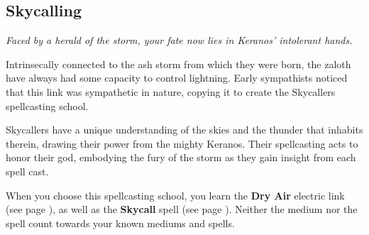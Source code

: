 \subsection*{Skycalling} \label{ssec::skycalling}
    \textit{Faced by a herald of the storm, your fate now lies in Keranos' intolerant hands.}

    Intrinsecally connected to the ash storm from which they were born, the zaloth have always had some capacity to control lightning.
    Early sympathists noticed that this link was sympathetic in nature, copying it to create the Skycallers spellcasting school.

    Skycallers have a unique understanding of the skies and the thunder that inhabits therein, drawing their power from the mighty Keranos.
    Their spellcasting acts to honor their god, embodying the fury of the storm as they gain insight from each spell cast.

    When you choose this spellcasting school, you learn the \textbf{Dry Air} electric link (see page \pageref{medium::dryair}), as well as the \textbf{Skycall} spell (see page \pageref{spell::skycall}).
    Neither the medium nor the spell count towards your known mediums and spells.

\newpage
